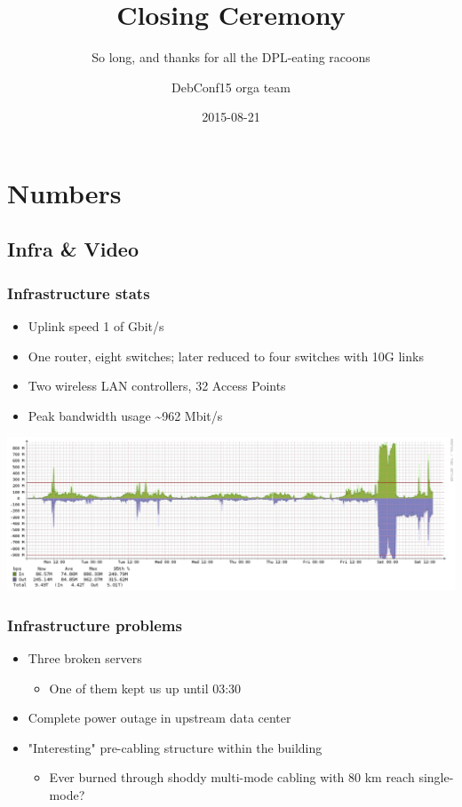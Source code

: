 \documentclass[t]{beamer}
\title{Closing Ceremony}
\subtitle{So long, and thanks for all the DPL-eating racoons}
\author{DebConf15 orga team}
\date{2015-08-21}
\begin{document}
\setcounter{tocdepth}{1}

\begin{frame}
	\titlepage
\end{frame}

\section{Numbers}


\subsection{Infra \& Video}

\begin{frame}
	\frametitle{Infrastructure stats}
	\begin{itemize}
		\item Uplink speed 1 of Gbit/s
		\item One router, eight switches; later reduced to four switches with 10G links
		\item Two wireless LAN controllers, 32 Access Points
		\item Peak bandwidth usage \~{}962 Mbit/s
	\end{itemize}
	\begin{center}
	\includegraphics[scale=0.2]{weekly2.pdf}
	\end{center}
\end{frame}

\begin{frame}
	\frametitle{Infrastructure problems}
	\begin{itemize}
		\item Three broken servers
		\begin{itemize}
			\item One of them kept us up until 03:30
		\end{itemize}
		\item Complete power outage in upstream data center
		\item "Interesting" pre-cabling structure within the building
		\begin{itemize}
			\item Ever burned through shoddy multi-mode cabling with 80 km reach single-mode?
		\end{itemize}
	\end{itemize}
\end{frame}
\end{document}
